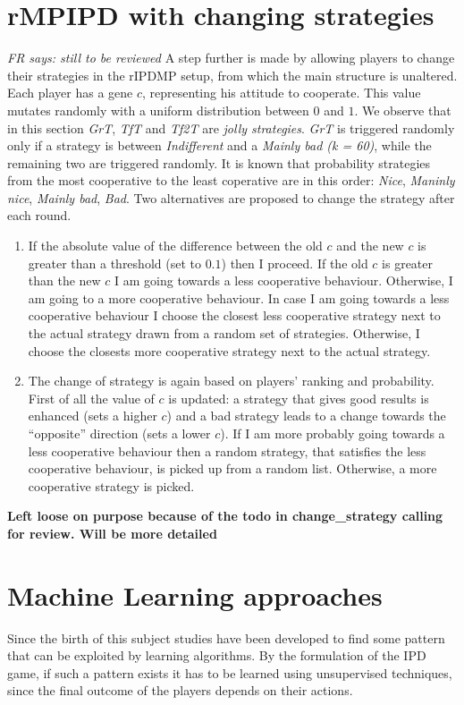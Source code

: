 \documentclass[journal,a4paper,10pt,twoside]{IEEEtran} %
\newcommand{\FR}[1]{\textit{\color{ForestGreen}FR says: #1}}
\begin{document}
\section{rMPIPD with changing strategies} \label{s:crIPDMP}
\FR{still to be reviewed}
A step further is made by allowing players to change their strategies in the rIPDMP setup, from which the main structure is unaltered.
Each player has a gene $c$, representing his attitude to cooperate. This value mutates randomly with a uniform distribution between $0$ and $1$.
We observe that in this section \textit{GrT}, \textit{TfT} and \textit{Tf2T} are \textit{jolly strategies}. \textit{GrT} is triggered randomly only if a strategy is between \textit{Indifferent} and a \textit{Mainly bad (k = 60)}, while the remaining two are triggered randomly. It is known that probability strategies from the most cooperative to the least coperative are in this order: \textit{Nice}, \textit{Maninly nice}, \textit{Mainly bad}, \textit{Bad}.
Two alternatives are proposed to change the strategy after each round.
\begin{enumerate}
    \item If the absolute value of the difference between the old $c$ and the new $c$ is greater than a threshold (set to $0.1$) then I proceed. If the old $c$ is greater than the new $c$ I am going towards a less cooperative behaviour. Otherwise, I am going to a more cooperative behaviour. 
    In case I am going towards a less cooperative behaviour I choose the closest less cooperative strategy next to the actual strategy drawn from a random set of strategies. Otherwise, I choose the closests more cooperative strategy next to the actual strategy.

    \item The change of strategy is again based on players' ranking and probability. First of all the value of $c$ is updated: a strategy that gives good results is enhanced (sets a higher $c$) and a bad strategy leads to a change towards the ``opposite'' direction (sets a lower $c$). If I am more probably going towards a less cooperative behaviour then a random strategy, that satisfies the less cooperative behaviour, is picked up from a random list. Otherwise, a more cooperative strategy is picked.
\end{enumerate}
\textbf{Left loose on purpose because of the todo in change_strategy calling for review. Will be more detailed}

\section{Machine Learning approaches} \label{s:ml}
Since the birth of this subject studies have been developed to find some pattern that can be exploited by learning algorithms.
By the formulation of the IPD game, if such a pattern exists it has to be learned using unsupervised techniques, since the final outcome of the players depends on their actions.
\end{document}
